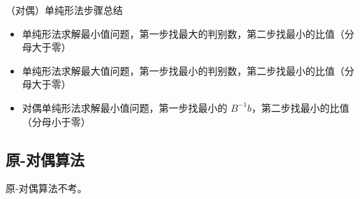 \begin{note}
    （对偶）单纯形法步骤总结
    \begin{itemize}
        \item 单纯形法求解最小值问题，第一步找最大的判别数，第二步找最小的比值（分母大于零）
        \item 单纯形法求解最大值问题，第一步找最小的判别数，第二步找最小的比值（分母大于零）
        \item 对偶单纯形法求解最小值问题，第一步找最小的 $B^{-1}b$，第二步找最小的比值（分母小于零）
    \end{itemize}    
\end{note}

\subsection{原-对偶算法}
原-对偶算法不考。
